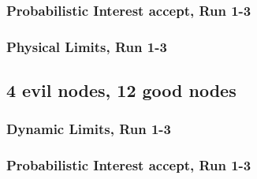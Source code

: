 \documentclass[onecolumn]{IEEEtran}
\begin{document}
\clearpage

\subsubsection{Probabilistic Interest accept, Run 1-3}

\begin{minipage}[b]{\textwidth}

\end{minipage}

\clearpage

\subsubsection{Physical Limits, Run 1-3}

\begin{minipage}[b]{\textwidth}

\end{minipage}

\clearpage
\subsection{\textbf{4 evil nodes}, 12 good nodes}

\subsubsection{Dynamic Limits, Run 1-3}

\begin{minipage}[b]{\textwidth}

\end{minipage}

\clearpage

\subsubsection{Probabilistic Interest accept, Run 1-3}

\begin{minipage}[b]{\textwidth}

\end{minipage}
\end{document}
